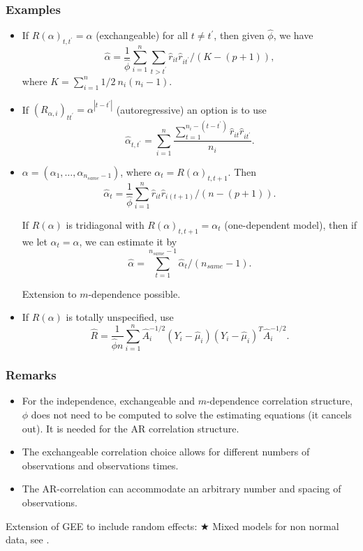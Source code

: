 \documentclass{beamer}
\newcommand{\bs}{\bigskip}
\begin{document}
\begin{frame}[allowframebreaks]
\frametitle{Examples}



\begin{itemize}
\item If $R(\alpha)_{t,t^\prime}=\alpha$ (exchangeable) for all $t \neq
  t^\prime$, then given $\hat{\phi}$, we have
$$\hat{\alpha} = \frac{1}{\hat{\phi}} \sum_{i=1}^n \sum_{t>t^\prime} \hat{r}_{it}
\hat{r}_{it^\prime} /(K-(p+1)),$$
where $K = \sum_{i=1}^n 1/2 \ n_i(n_i-1)$.
\item If $(R_{\alpha,i})_{tt^\prime} = \alpha^{|t-t^\prime|}$
  (autoregressive) an  option is to use
$$\hat{\alpha}_{t,t^\prime} = \sum_{i=1}^n \frac{\sum_{t=1}^{n_i-(t-t^\prime)}\hat{r}_{it}
\hat{r}_{it^\prime}}{n_i}.$$ 
\item $\alpha = (\alpha_1, \ldots, \alpha_{n_{same}-1})$, where
  $\alpha_t = R(\alpha)_{t,t+1}$. Then
$$\hat{\alpha}_t = \frac{1}{\hat{\phi}} \sum_{i=1}^n \hat{r}_{it} \hat{r}_{i(t+1)} /
(n-(p+1)).$$


If $R(\alpha)$ is tridiagonal with $R(\alpha)_{t,t+1}=\alpha_t$
(one-dependent model), then if we let $\alpha_t=\alpha$, we can
estimate it by
$$\hat{\alpha} =  \sum_{t=1}^{n_{same}-1} \hat{\alpha}_t /(n_{same}-1).$$

\bs
Extension to $m$-dependence possible.
\item If $R(\alpha)$ is totally unspecified, use
$$\hat{R} = \frac{1}{\hat{\phi}n} \sum_{i=1}^n \hat{A}_i^{-1/2} (Y_i - \hat{\mu}_i)
(Y_i - \hat{\mu}_i)^T \hat{A}_i^{-1/2}.$$
\end{itemize}
\end{frame}

\begin{frame}
\frametitle{Remarks}
\begin{itemize}
\item For the independence, exchangeable and $m$-dependence
  correlation structure, $\phi$ does not need to be computed to solve
  the estimating equations (it cancels out). It is needed for the AR
  correlation structure.
\item The exchangeable correlation choice allows for different numbers
  of observations and observations times.
\item The AR-correlation can accommodate an arbitrary number and
  spacing of observations.
\end{itemize}

\bs

Extension of GEE to include random effects:
{\color{red} $\bigstar$ Mixed models for non normal data, see
.}
\end{frame}
\end{document}

